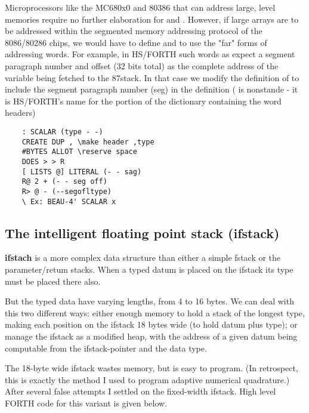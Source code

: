Microprocessors like the MC680x0 and 80386 that can address large, level memories require no further elaboration for  and . However, if large arrays are to be addressed within the segmented memory addressing protocol of the 8086/80286 chips, we would have to define  and  to use the "far" forms of addressing words. For example, in HS/FORTH such words as  expect a segment paragraph number and offset (32 bits total) as the complete address of the variable being fetched to the 87stack. In that case we modify the definition of  to include the segment paragraph number (seg) in the definition ( is nonstande - it is HS/FORTH's name for the portion of the dictionary containing the word headers)

\begin{lstlisting}
    : SCALAR (type - -)
    CREATE DUP , \make header ,type
    #BYTES ALLOT \reserve space
    DOES > > R
    [ LISTS @] LITERAL (- - sag)
    R@ 2 + (- - seg off)
    R> @ - (--segofltype)
    \ Ex: BEAU-4' SCALAR x
\end{lstlisting}

\subsection{The intelligent floating point stack (ifstack)}
 \textbf{ifstach} is a more complex data structure than either a simple fstack or the parameter/retum stacks. When a typed datum is placed on the ifstack its type must be placed there also.

But the typed data have varying lengths, from 4 to 16 bytes. We can deal with this two different ways: either  enough memory to hold a stack of the longest type, making each position on the ifstack 18 bytes wide (to hold datum plus type); or manage the ifstack as a modified heap, with the address of a given datum being computable from the ifstack-pointer and the data type.

The 18-byte wide ifstack wastes memory, but is easy to program. (In retrospect, this is exactly the method I used to program adaptive numerical quadrature.) After several false attempts I settled on the fixed-width ifstack. High level FORTH code for this variant is given below.

